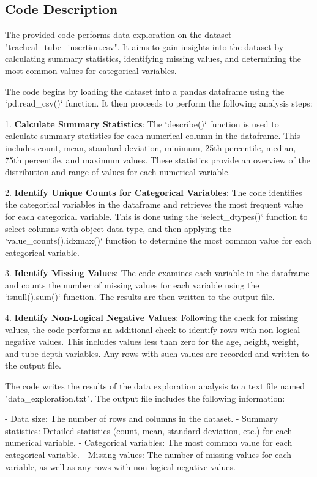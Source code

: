 \documentclass[11pt]{article}
\begin{document}
\subsection{Code Description}

The provided code performs data exploration on the dataset "tracheal\_tube\_insertion.csv". It aims to gain insights into the dataset by calculating summary statistics, identifying missing values, and determining the most common values for categorical variables.

The code begins by loading the dataset into a pandas dataframe using the `pd.read\_csv()` function. It then proceeds to perform the following analysis steps:

1. \textbf{Calculate Summary Statistics}: The `describe()` function is used to calculate summary statistics for each numerical column in the dataframe. This includes count, mean, standard deviation, minimum, 25th percentile, median, 75th percentile, and maximum values. These statistics provide an overview of the distribution and range of values for each numerical variable.

2. \textbf{Identify Unique Counts for Categorical Variables}: The code identifies the categorical variables in the dataframe and retrieves the most frequent value for each categorical variable. This is done using the `select\_dtypes()` function to select columns with object data type, and then applying the `value\_counts().idxmax()` function to determine the most common value for each categorical variable.

3. \textbf{Identify Missing Values}: The code examines each variable in the dataframe and counts the number of missing values for each variable using the `isnull().sum()` function. The results are then written to the output file.

4. \textbf{Identify Non-Logical Negative Values}: Following the check for missing values, the code performs an additional check to identify rows with non-logical negative values. This includes values less than zero for the age, height, weight, and tube depth variables. Any rows with such values are recorded and written to the output file.

The code writes the results of the data exploration analysis to a text file named "data\_exploration.txt". The output file includes the following information:

- Data size: The number of rows and columns in the dataset.
- Summary statistics: Detailed statistics (count, mean, standard deviation, etc.) for each numerical variable.
- Categorical variables: The most common value for each categorical variable.
- Missing values: The number of missing values for each variable, as well as any rows with non-logical negative values.
\end{document}
